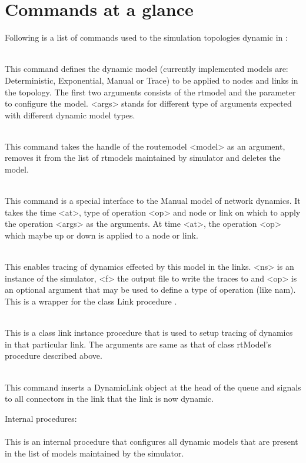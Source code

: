 \section{Commands at a glance}
\label{sec:dynamicscommand}

Following is a list of commands used to the simulation topologies dynamic
in \ns:

\begin{flushleft}
\\
This command defines the dynamic model (currently implemented models are:
Deterministic, Exponential, Manual or
Trace) to be applied to nodes and links in the topology. The first two
arguments consists of the rtmodel and the parameter to configure the
model. <args> stands for different type of arguments expected with
different dynamic model types.


\\
This command takes the handle of the routemodel <model> as an argument,
removes  it from the list of rtmodels maintained by simulator and deletes
the model.


\\
This command is a special interface to the Manual model of network dynamics.
It takes the time <at>, type of operation <op> and node or link on which
to apply the operation <args> as the arguments. At time <at>, the operation <op>
which maybe up or down is applied to a node or link.

\\
This enables tracing of dynamics effected by this model in the links. <ns>
is an instance of the simulator, <f> the output file to write the traces to
and <op> is an optional argument that may be used to define a type of
operation (like nam). This is a wrapper for the class Link procedure
.


\\
This is a class link instance procedure that is used to setup tracing of
dynamics in that particular link. The arguments are same as that of class
rtModel's procedure  described above.


\\
This command inserts a DynamicLink object at the head of the queue and signals
to all connectors in the link that the link is now dynamic.


Internal procedures:\\

\\
This is an internal procedure that configures all dynamic models that are
present in the list of models maintained by the simulator.

\end{flushleft}

\endinput

### Local Variables:
### mode: latex
### comment-column: 60
### backup-by-copying-when-linked: t
### file-precious-flag: nil
### End:
